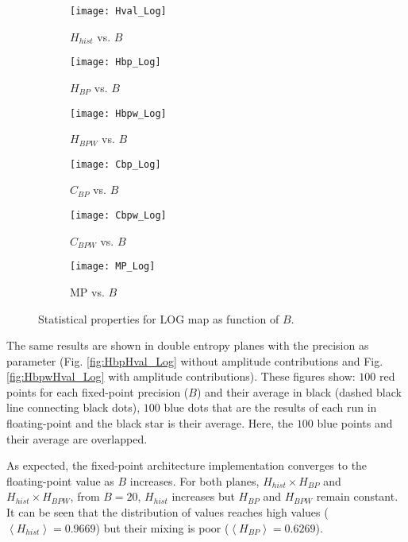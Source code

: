 \begin{figure}[htpb]
	\centering
	\begin{subfigure}[b]{0.49\textwidth}
		\texttt{[image: Hval\_Log]}
		\caption{$H_{hist}$ vs. $B$}
		\label{fig:Hval_Log}
	\end{subfigure}
	\begin{subfigure}[b]{0.49\textwidth}
		\texttt{[image: Hbp\_Log]}
		\caption{$H_{BP}$ vs. $B$}
		\label{fig:Hbp_Log}
	\end{subfigure}
	\begin{subfigure}[b]{0.49\textwidth}
		\texttt{[image: Hbpw\_Log]}
		\caption{$H_{BPW}$ vs. $B$}
		\label{fig:Hbpw_Log}
	\end{subfigure}
	\begin{subfigure}[b]{0.49\textwidth}
		\texttt{[image: Cbp\_Log]}
		\caption{$C_{BP}$ vs. $B$}
		\label{fig:Cbp_Log}
	\end{subfigure}
	\begin{subfigure}[b]{0.49\textwidth}
		\texttt{[image: Cbpw\_Log]}
		\caption{$C_{BPW}$ vs. $B$}
		\label{fig:Cbpw_Log}
	\end{subfigure}
	\begin{subfigure}[b]{0.49\textwidth}
		\texttt{[image: MP\_Log]}
		\caption{MP vs. $B$}
		\label{fig:MP_Log}
	\end{subfigure}
	\caption{Statistical properties for LOG map as function of $B$.}
	\label{fig:LOG_QuantiB}
\end{figure}

The same results are shown in double entropy planes with the precision as parameter (Fig. \ref{fig:HbpHval_Log} without amplitude contributions and Fig. \ref{fig:HbpwHval_Log} with amplitude contributions).
These figures show: $100$ red points for each fixed-point precision ($B$) and their average in black (dashed black line connecting black dots), $100$ blue dots that are the results of each run in floating-point and the black star is their average.
Here, the $100$ blue points and their average are overlapped.

As expected, the fixed-point architecture implementation converges to the floating-point value as $B$ increases.
For both planes, $H_{hist} \times H_{BP}$ and $H_{hist} \times H_{BPW}$, from $B=20$, $H_{hist}$ increases but $H_{BP}$ and $H_{BPW}$ remain constant.
It can be seen that the distribution of values reaches high values ($\left\langle H_{hist}\right\rangle =0.9669$) but their mixing is poor ($\left\langle H_{BP}\right\rangle =0.6269$).

